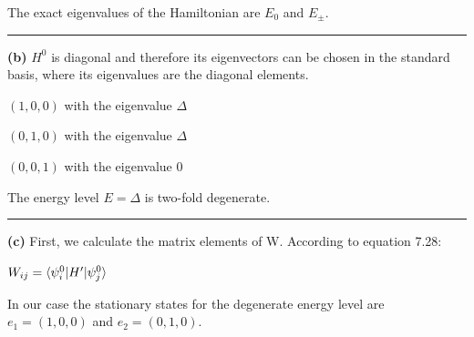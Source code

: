 \documentclass[14pt]{extarticle}
\makeatletter
\newenvironment{lefteqs}{%
    \begin{flushleft}%
    \renewcommand{\arraystretch}{1.3}%
    $\begin{array}{@{}l@{}}%
}{%
    \end{array}$%
    \end{flushleft}%
}
\makeatother
\begin{document}
The exact eigenvalues of the Hamiltonian are $E_0$ and $E_{\pm}$.

\vspace{3em}
\hrule
\vspace{2em}

\textbf{(b)}
$H^0$ is diagonal and therefore its eigenvectors can be chosen in the standard basis, where its eigenvalues are the diagonal elements.

$(1,0,0)$ with the eigenvalue $\Delta$

$(0,1,0)$ with the eigenvalue $\Delta$

$(0,0,1)$ with the eigenvalue $0$

The energy level $E=\Delta$ is two-fold degenerate.

\vspace{3em}
\hrule
\vspace{2em}

\textbf{(c)}
First, we calculate the matrix elements of W.
According to equation 7.28:
\begin{lefteqs}
    W_{ij} = \langle \psi^0_i | H' | \psi^0_j \rangle
\end{lefteqs}

In our case the stationary states for the degenerate energy level are
$e_1 = (1,0,0)$ and $e_2 = (0,1,0)$.
\end{document}
